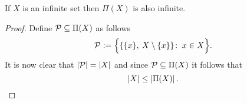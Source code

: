 \begin{rem}\label{rem:partfinsze}
  If $X$ is an infinite set then $\Pi(X)$ is also infinite.
\end{rem}

\begin{proof}
  Define $\P \subseteq \Pi(X)$ as follows
  \begin{equation*}
    \P := \Big\{ \{ \{x\}, \: X\setminus\{x\}\}\colon \: x \in X \Big\}.
  \end{equation*}
  It is now clear that $\left| \P \right| = \left| X \right|$ and since $\P \subseteq \Pi(X)$ it follows that 
  \begin{equation*}
    \left| X \right| \leq \left| \Pi(X) \right|.\qedhere
  \end{equation*}
\end{proof}
